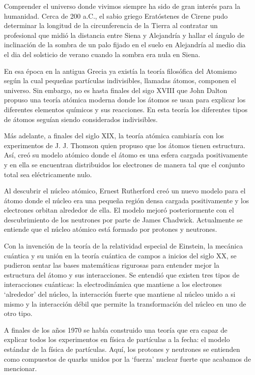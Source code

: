 Comprender el universo donde vivimos siempre ha sido de gran interés para la humanidad. Cerca de 200 a.C., el sabio griego Eratóstenes de Cirene pudo determinar la longitud de la circunferencia de la Tierra al contratar un profesional que midió la distancia entre Siena y Alejandría y hallar el ángulo de inclinación de la sombra de un palo fijado en el suelo en Alejandría al medio dia el dia del solsticio de verano cuando la sombra era nula en Siena.

En esa época en la antigua Grecia ya existía la teoría filosófica del Atomismo según la cual pequeñas partículas indivisibles, llamadas átomos, componen el universo. Sin embargo, no es hasta finales del sigo XVIII que John Dalton propuso una teoría atómica moderna donde los átomos se usan para explicar los diferentes elementos químicos y sus reacciones. En esta teoría los diferentes tipos de átomos seguían siendo considerados indivisibles.

Más adelante, a finales del siglo XIX, la teoría atómica cambiaría con los experimentos de J. J. Thomson quien propuso que los átomos tienen estructura. Así, creó su modelo atómico donde el átomo es una esfera cargada positivamente y en ella se encuentran distribuidos los electrones de manera tal que el conjunto total sea eléctricamente nulo. 

Al descubrir el núcleo atómico, Ernest Rutherford creó un nuevo modelo para el átomo donde el núcleo era una pequeña región densa cargada positivamente y los electrones orbitan alrededor de ella. El modelo mejoró posteriormente con el descubrimiento de los neutrones por parte de James Chadwick. Actualmente se entiende que el núcleo atómico está formado por protones y neutrones.

Con la invención de la teoría de la relatividad especial de Einstein, la mecánica cuántica  y su unión en la teoría cuántica de campos a inicios del siglo XX, se pudieron sentar las bases matemáticas rigurosas para entender mejor la estructura del átomo y sus interacciones. Se entendió que existen tres tipos de interacciones cuánticas: la electrodinámica que mantiene a los electrones `alrededor' del núcleo, la interacción fuerte que mantiene al núcleo unido a si mismo y la interacción débil que permite la transformación del núcleo en uno de otro tipo.

A finales de los años 1970 se había construido una teoría que era capaz de explicar todos los experimentos en física de partículas a la fecha: el modelo estándar de la física de partículas. Aquí, los protones y neutrones se entienden como compuestos de quarks unidos por la `fuerza' nuclear fuerte que acabamos de mencionar. 


